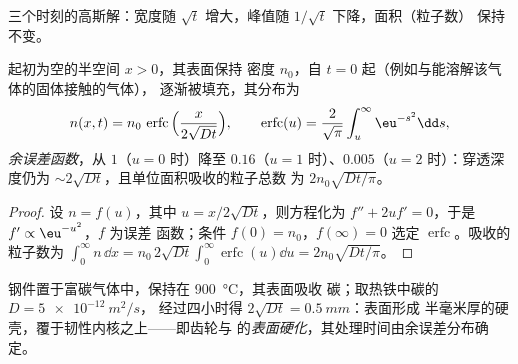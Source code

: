 \begin{omfigure}

{\small 三个时刻的高斯解：宽度随
$\sqrt t$ 增大，峰值随 $1/\sqrt t$ 下降，面积（粒子数）
保持不变。}
\end{omfigure}

\begin{proposition}[表面浓度恒定]\label{prop:b2:particle-diffusion:erfc}
起初为空的半空间 $x > 0$，其表面保持
密度 $n_0$，自 $t = 0$ 起（例如与能溶解该气体的固体接触的气体），
逐渐被填充，其分布为
\[
n(x,t) = n_0\,\operatorname{erfc}\Big(\frac{x}{2\sqrt{Dt}}\Big),
\qquad
\operatorname{erfc}(u) = \frac{2}{\sqrt\pi}\int_u^{\infty}\eu^{-s^2}\dd s,
\]
\emph{余误差函数}，从 $1$（$u =
0$ 时）降至 $0.16$（$u = 1$ 时）、$0.005$（$u = 2$ 时）：穿透深度仍为
$\sim 2\sqrt{Dt}$，且单位面积吸收的粒子总数
为 $2n_0\sqrt{Dt/\pi}$。
\end{proposition}

\begin{proof}
设 $n = f(u)$，其中 $u = x/2\sqrt{Dt}$，则方程化为
$f'' + 2uf' = 0$，于是 $f' \propto \eu^{-u^2}$，$f$ 为误差
函数；条件 $f(0) = n_0$，$f(\infty) = 0$ 选定
$\operatorname{erfc}$。吸收的粒子数为 $\int_0^\infty n\,\dd x =
n_0\,2\sqrt{Dt}\int_0^\infty\operatorname{erfc}(u)\dd u = 2n_0\sqrt{Dt/\pi}$。
\end{proof}

\begin{example}[钢件硬化]\label{ex:b2:particle-diffusion:carburising}
钢件置于富碳气体中，保持在 \qty{900}{\celsius}，其表面吸收
碳；取热铁中碳的 $D = \qty{5e-12}{m^2/s}$，
经过四小时得 $2\sqrt{Dt} = \qty{0.5}{mm}$：表面形成
半毫米厚的硬壳，覆于韧性内核之上——即齿轮与
的\emph{表面硬化}，其处理时间由余误差分布确定。
\end{example}


